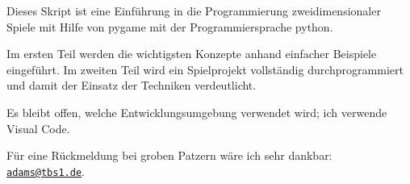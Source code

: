 Dieses Skript ist eine Einführung in die Programmierung zweidimensionaler Spiele mit Hilfe von \Gls{pygame} mit der Programmiersprache \Gls{python}. 

Im ersten Teil werden die wichtigsten Konzepte anhand einfacher Beispiele eingeführt. Im zweiten Teil wird ein Spielprojekt vollständig durchprogrammiert und damit der Einsatz der Techniken verdeutlicht.

Es bleibt offen, welche Entwicklungsumgebung verwendet wird; ich verwende Visual Code.

Für eine Rückmeldung bei groben Patzern wäre ich sehr dankbar: \href{mailto:adams@tbs1.de}{\nolinkurl{adams@tbs1.de}}.



